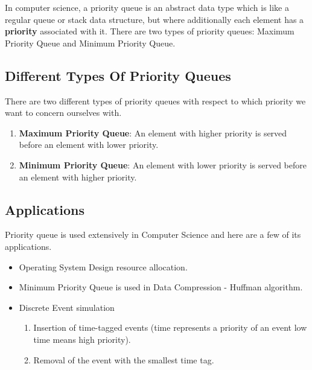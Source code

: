 In computer science, a priority queue is an abstract data type which is like a regular queue or stack data structure, but where additionally each element has a \textbf{priority} associated with it. 
\newline
There are two types of priority queues: Maximum Priority Queue and Minimum Priority Queue.
\subsection{Different Types Of Priority Queues}
There are two different types of priority queues with respect to which priority we
want to concern ourselves with.
\begin{enumerate}
    \item \textbf{Maximum Priority Queue}: An element with higher priority is served before an element with lower priority.
    \item \textbf{Minimum Priority Queue}: An element with lower priority is served before an element with higher priority.
\end{enumerate}

\subsection{Applications}
Priority queue is used extensively in Computer Science and here are a few of its 
applications.
\begin{itemize}
    \item Operating System Design resource allocation.
    \item Minimum Priority Queue is used in Data Compression - Huffman algorithm.
    \item Discrete Event simulation
    \begin{enumerate}
        \item Insertion of time-tagged events (time represents a priority of an event low time means high priority).
        \item Removal of the event with the smallest time tag.
    \end{enumerate}
\end{itemize}

